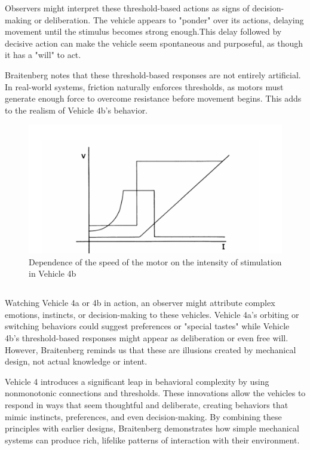 \documentclass{article}
\begin{document}
	Observers might interpret these threshold-based actions as signs of decision-making or deliberation. The vehicle appears to "ponder" over its actions, delaying movement until the stimulus becomes strong enough.This delay followed by decisive action can make the vehicle seem spontaneous and purposeful, as though it has a "will" to act.

	Braitenberg notes that these threshold-based responses are not entirely artificial. In real-world systems, friction naturally enforces thresholds, as motors must generate enough force to overcome resistance before movement begins. This adds to the realism of Vehicle 4b's behavior.

	\begin{figure}[h]
		\centering
		\includegraphics[scale=1]{images/figure_8.png}
		\caption{Dependence of the speed of the motor on the intensity of stimulation in Vehicle 4b}
		\label{fig:vehicle-4b}
	\end{figure}

	\subsection*{}

	Watching Vehicle 4a or 4b in action, an observer might attribute complex emotions, instincts, or decision-making to these vehicles. Vehicle 4a's orbiting or switching behaviors could suggest preferences or "special tastes" while Vehicle 4b's threshold-based responses might appear as deliberation or even free will. However, Braitenberg reminds us that these are illusions created by mechanical design, not actual knowledge or intent.


	Vehicle 4 introduces a significant leap in behavioral complexity by using nonmonotonic connections and thresholds. These innovations allow the vehicles to respond in ways that seem thoughtful and deliberate, creating behaviors that mimic instincts, preferences, and even decision-making. By combining these principles with earlier designs, Braitenberg demonstrates how simple mechanical systems can produce rich, lifelike patterns of interaction with their environment.
\end{document}
